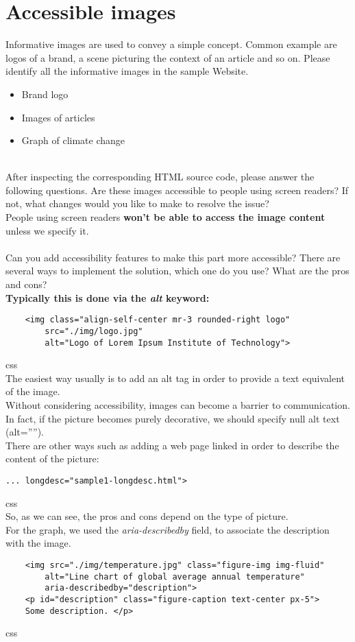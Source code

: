 \documentclass[a4paper,11pt]{article}
\theoremstyle{mytheor}
\begin{document}
\section{Accessible images}
Informative images are used to convey a simple concept. Common example are logos of a brand, a scene picturing the context of an article and so on. Please identify all the informative images in the sample Website.
\begin{itemize}
    \item Brand logo
    \item Images of articles
    \item Graph of climate change
\end{itemize}\\
After inspecting the corresponding HTML source code, please answer the following questions. Are these images accessible to people using screen readers? If not, what changes would you like to make to resolve the issue?\\
People using screen readers {\textbf{won't be able to access the image content}} unless we specify it.\\
\\
Can you add accessibility features to make this part more accessible? There are several ways to implement the solution, which one do you use? What are the pros and cons?\\
{\textbf{Typically this is done via the \emph{alt} keyword: }}
\begin{verbatim}
    <img class="align-self-center mr-3 rounded-right logo" 
        src="./img/logo.jpg" 
        alt="Logo of Lorem Ipsum Institute of Technology">
\end{verbatim}{css}\\
The easiest way usually is to add an alt tag in order to provide a text equivalent of the image.\\
Without considering accessibility, images can become a barrier to communication.\\
In fact, if the picture becomes purely decorative, we should specify null alt text (alt=””).\\
There are other ways such as adding a web page linked in order to describe the content of the picture:
\begin{verbatim}
... longdesc="sample1-longdesc.html">
\end{verbatim}{css}\\
So, as we can see, the pros and cons depend on the type of picture.\\
For the graph, we used the \emph{aria-describedby} field, to associate the description with the image.
\begin{verbatim}
    <img src="./img/temperature.jpg" class="figure-img img-fluid" 
        alt="Line chart of global average annual temperature" 
        aria-describedby="description">
    <p id="description" class="figure-caption text-center px-5">
    Some description. </p>
\end{verbatim}{css}
\newpage
\end{document}
